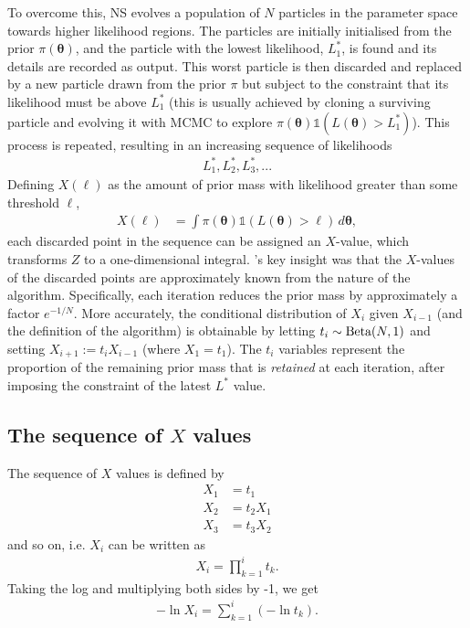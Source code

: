 \documentclass[entropy,article,accept,oneauthor,pdftex,10pt,a4paper]{mdpi}
\newcommand{\x}{\boldsymbol{\theta}}
\begin{document}
To overcome this, NS evolves a population of $N$ particles in the parameter
space towards higher likelihood regions.
The particles are initially initialised from the prior $\pi(\x)$, and the
particle with the lowest likelihood, $L^*_1$, is found and its details are
recorded as output. This worst particle is then discarded
and replaced by a new particle
drawn from the prior $\pi$ but subject to the constraint that its likelihood
must be above $L^*_1$ (this is usually achieved by cloning a surviving particle
and evolving it with MCMC to explore
$\pi(\x)\mathds{1}\left(L(\x) > L^*_1\right)$).
This process is repeated, resulting in an
increasing sequence of likelihoods
\begin{align}
L^*_1, L^*_2, L^*_3,... \label{eqn:likelihood_sequence}
\end{align}
Defining $X(\ell)$ as the amount of prior mass with likelihood greater than
some threshold $\ell$,
\begin{align}
X(\ell) &= \int \pi(\x) \mathds{1}\left(L(\x) > \ell\right) \, d\x,
\end{align}
each discarded point in the sequence can be assigned an $X$-value,
which transforms $Z$ to a one-dimensional integral.
\citet{skilling2006nested}'s key insight was that the
$X$-values of the discarded points are approximately known from the nature of the
algorithm. Specifically, each iteration reduces the prior mass by approximately
a factor $e^{-1/N}$. More accurately, the conditional distribution of
$X_{i}$ given $X_{i-1}$ (and the definition of the algorithm)
is obtainable by letting
$t_i \sim \textnormal{Beta}(N,1)$ and setting $X_{i+1} := t_iX_{i-1}$ (where
$X_1 = t_1$).
The $t_i$ variables represent the proportion of the remaining prior mass
that is {\em retained} at each iteration, after imposing the constraint of the
latest $L^*$ value.

\subsection{The sequence of $X$ values}

The sequence of $X$ values is defined by
\begin{align}
X_1 &= t_1 \\
X_2 &= t_2X_1 \\
X_3 &= t_3X_2
\end{align}
and so on, i.e. $X_i$ can be written as
\begin{align}
X_i = \prod_{k=1}^i t_k.
\end{align}
Taking the log and multiplying both sides by -1, we get
\begin{align}
-\ln X_i = \sum_{k=1}^i \left(-\ln t_k\right).\label{eqn:minuslogX}
\end{align}
\end{document}

